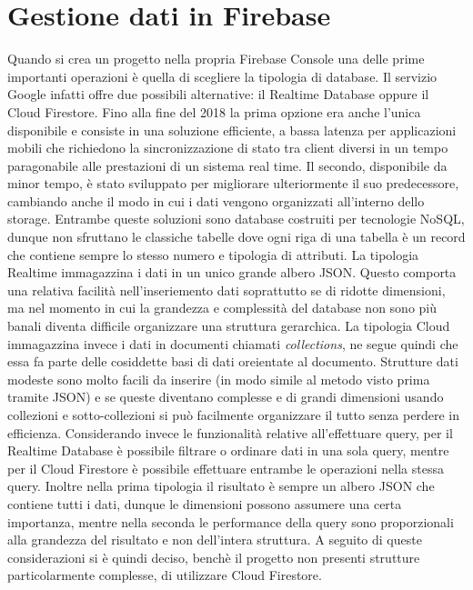 \section{Gestione dati in Firebase}
Quando si crea un progetto nella propria Firebase Console una delle prime
importanti operazioni è quella di scegliere la tipologia di database. Il
servizio Google infatti offre due possibili alternative: il Realtime Database
oppure il Cloud Firestore. Fino alla fine del 2018 la prima opzione era anche
l'unica disponibile e consiste in una soluzione efficiente, a bassa latenza per
applicazioni mobili che richiedono la sincronizzazione di stato tra client
diversi in un tempo paragonabile alle prestazioni di un sistema real time. Il
secondo, disponibile da minor tempo, è stato sviluppato per migliorare
ulteriormente il suo predecessore, cambiando anche il modo in cui i dati vengono
organizzati all'interno dello storage. Entrambe queste soluzioni sono database
costruiti per tecnologie NoSQL, dunque non sfruttano le classiche tabelle dove
ogni riga di una tabella è un record che contiene sempre lo stesso numero e
tipologia di attributi. La tipologia Realtime immagazzina i dati in un unico
grande albero JSON. Questo comporta una relativa facilità nell'inseriemento dati
soprattutto se di ridotte dimensioni, ma nel momento in cui la grandezza e
complessità del database non sono più banali diventa difficile organizzare una
struttura gerarchica. La tipologia Cloud immagazzina invece i dati in documenti
chiamati \textit{collections}, ne segue quindi che essa fa parte delle cosiddette
basi di dati oreientate al documento. Strutture dati modeste sono molto facili
da inserire (in modo simile al metodo visto prima tramite JSON) e se queste
diventano complesse e di grandi dimensioni usando collezioni e sotto-collezioni si
può facilmente organizzare il tutto senza perdere in efficienza. Considerando
invece le funzionalità relative all'effettuare query, per il Realtime Database è
possibile filtrare o ordinare dati in una sola query, mentre per il Cloud
Firestore è possibile effettuare entrambe le operazioni nella stessa query.
Inoltre nella prima tipologia il risultato è sempre un albero JSON che contiene
tutti i dati, dunque le dimensioni possono assumere una certa importanza, mentre
nella seconda le performance della query sono proporzionali alla grandezza del
risultato e non dell'intera struttura. A seguito di queste considerazioni si è
quindi deciso, benchè il progetto non presenti strutture particolarmente
complesse, di utilizzare Cloud Firestore. 

